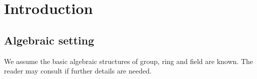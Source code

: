 \chapter{Introduction}

\section{Algebraic setting} %
\label{sec:algebraic_setting}

We assume the basic algebraic structures of group, ring and field are known. The reader may consult
\cite{lang:algebra} if further details are needed.



